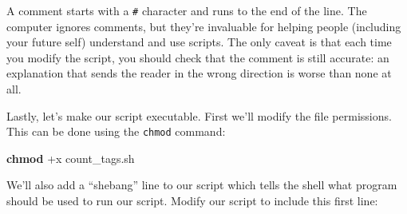 \documentclass[
]{book}
\newenvironment{Shaded}{\begin{snugshade}}{\end{snugshade}}
\newcommand{\AttributeTok}[1]{\textcolor[rgb]{0.13,0.29,0.53}{#1}}
\newcommand{\BuiltInTok}[1]{#1}
\newcommand{\CommentTok}[1]{\textcolor[rgb]{0.56,0.35,0.01}{\textit{#1}}}
\newcommand{\ControlFlowTok}[1]{\textcolor[rgb]{0.13,0.29,0.53}{\textbf{#1}}}
\newcommand{\ExtensionTok}[1]{#1}
\newcommand{\FunctionTok}[1]{\textcolor[rgb]{0.13,0.29,0.53}{\textbf{#1}}}
\newcommand{\KeywordTok}[1]{\textcolor[rgb]{0.13,0.29,0.53}{\textbf{#1}}}
\newcommand{\NormalTok}[1]{#1}
\newcommand{\StringTok}[1]{\textcolor[rgb]{0.31,0.60,0.02}{#1}}
\newcommand{\VariableTok}[1]{\textcolor[rgb]{0.00,0.00,0.00}{#1}}
\begin{document}
\begin{Shaded}
\end{Shaded}

\begin{Shaded}
\end{Shaded}

A comment starts with a \texttt{\#} character and runs to the end of the line. The computer ignores comments, but they're invaluable for helping people (including your future self) understand and use scripts. The only caveat is that each time you modify the script, you should check that the comment is still accurate: an explanation that sends the reader in the wrong direction is worse than none at all.

Lastly, let's make our script executable. First we'll modify the file permissions. This can be done using the \texttt{chmod} command:

\begin{Shaded}
\begin{Highlighting}[]
\FunctionTok{chmod}\NormalTok{ +x count\_tags.sh}
\end{Highlighting}
\end{Shaded}

We'll also add a ``shebang'' line to our script which tells the shell what program should be used to run our script. Modify our script to include this first line:

\begin{Shaded}
\end{Shaded}
\end{document}
